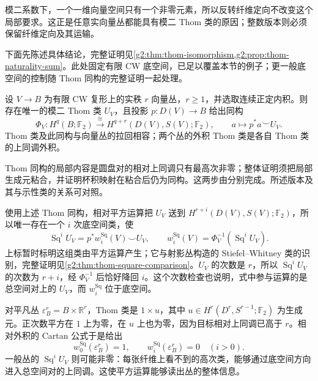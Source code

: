 模二系数下，一个一维向量空间只有一个非零元素，所以反转纤维定向不改变这个局部要求。这正是任意实向量丛都能具有模二 Thom 类的原因；整数版本则必须保留纤维定向及其运输。

\ProseParagraphBreak

下面先陈述具体结论，完整证明见\cref{g2:thm:thom-isomorphism,g2:prop:thom-naturality-sum}。此处固定有限 CW 底空间，已足以覆盖本节的例子；更一般底空间的控制随 Thom 同构的完整证明一起处理。

\begin{theorem}[模二 Thom 同构]\label{g2:thm:thom-mod-two-preview}
	设 \(V\to B\) 为有限 CW 复形上的实秩 \(r\) 向量丛，\(r\ge1\)，并选取连续正定内积。则存在唯一的模二 Thom 类 \(U_V\)，且投影 \(p:D(V)\to B\) 给出同构
	\begin{equation}\label{g2:eq:thom-mod-two-isomorphism}
		\Phi_V:H^q(B;\mathbb F_2)\xrightarrow{\cong}H^{q+r}(D(V),S(V);\mathbb F_2),\qquad a\longmapsto p^*a\smile U_V.
	\end{equation}
	Thom 类及此同构与向量丛的拉回相容；两个丛的外积 Thom 类是各自 Thom 类的上同调外积。
\end{theorem}

Thom 同构的局部内容是圆盘对的相对上同调只有最高次非零；整体证明须把局部生成元粘合，并证明杯积映射在粘合后仍为同构。这两步由分别完成。所述版本及其与示性类的关系可对照\cite[第23章第5--6节]{May1999}。

\ProseParagraphBreak

使用上述 Thom 同构，相对平方运算把 \(U_V\) 送到 \(H^{r+i}(D(V),S(V);\mathbb F_2)\)，所以唯一存在一个 \(i\) 次底空间类，使
\begin{equation}\label{g2:eq:thom-square-identity}
	\operatorname{Sq}^i U_V=p^*w_i^{\mathrm{Sq}}(V)\smile U_V,
	\qquad w_i^{\mathrm{Sq}}(V)=\Phi_V^{-1}(\operatorname{Sq}^i U_V).
\end{equation}
上标暂时标明这组类由平方运算产生；它与射影丛构造的 Stiefel--Whitney 类的识别，完整证明见\cref{g2:thm:thom-square-comparison}。\(U_V\) 的次数是 \(r\)，所以 \(\operatorname{Sq}^i U_V\) 的次数为 \(r+i\)，经 \(\Phi_V^{-1}\) 后恰好降回 \(i\)。这个次数检查也说明，式中参与运算的是总空间对上的 \(U_V\)，而 \(w_i^{\mathrm{Sq}}\) 位于底空间。

\ProseParagraphBreak

对平凡丛 \(\varepsilon_B^r=B\times\mathbb R^r\)，Thom 类是 \(1\times u\)，其中 \(u\in H^r(D^r,S^{r-1};\mathbb F_2)\) 为生成元。正次数平方在 \(1\) 上为零，在 \(u\) 上也为零，因为目标相对上同调已高于 \(r\)。相对外积的 Cartan 公式于是给出
\[
	w_0^{\mathrm{Sq}}(\varepsilon_B^r)=1,\qquad w_i^{\mathrm{Sq}}(\varepsilon_B^r)=0\quad(i>0).
\]
一般丛的 \(\operatorname{Sq}^i U_V\) 则可能非零：每张纤维上看不到的高次类，能够通过底空间方向进入总空间对的上同调。这使平方运算能够读出丛的整体信息。

